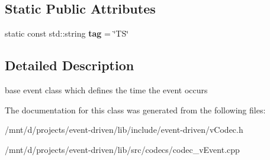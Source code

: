 \subsection*{Static Public Attributes}
\begin{DoxyCompactItemize}
\item 
\mbox{\label{classev_1_1vEvent_a54bcc0830c5993b56f1f47e23df1de8e}} 
static const std\+::string {\bfseries tag} = \char`\"{}TS\char`\"{}
\end{DoxyCompactItemize}


\subsection{Detailed Description}
base event class which defines the time the event occurs 

The documentation for this class was generated from the following files\+:\begin{DoxyCompactItemize}
\item 
/mnt/d/projects/event-\/driven/lib/include/event-\/driven/v\+Codec.\+h\item 
/mnt/d/projects/event-\/driven/lib/src/codecs/codec\+\_\+v\+Event.\+cpp\end{DoxyCompactItemize}
